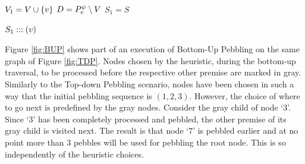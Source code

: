 \documentclass{llncs}
\newcommand{\nodedistance}{0.6cm}
\begin{document}
\begin{algorithm}[h]
	
	$V_1 = V \cup \{v\}$\;
	$D = P_{v}^{\psi} \setminus V$\;
	$S_1 = S$
	
	
	\Return $S_1 ::: (v)$\;
	
  \caption[.]{}
  \label{algo:visit}
\end{algorithm}

\begin{example}
Figure \ref{fig:BUP} shows part of an execution of Bottom-Up Pebbling on the same graph of Figure \ref{fig:TDP}.
Nodes chosen by the heuristic, during the bottom-up traversal, to be processed before the respective other premise are marked in gray. Similarly to the Top-down Pebbling scenario, nodes have been chosen in such a way that the initial pebbling sequence is $(1,2,3)$.
However, the choice of where to go next is predefined by the gray nodes. Consider the gray child of node `$3$'. Since `$3$' has been completely processed and pebbled, the other premise of its gray child is visited next. The result is that node `$7$' is pebbled earlier and at no point more than 3 pebbles will be used for pebbling the root node. This is so independently of the heuristic choices.


\end{example}
\end{document}
